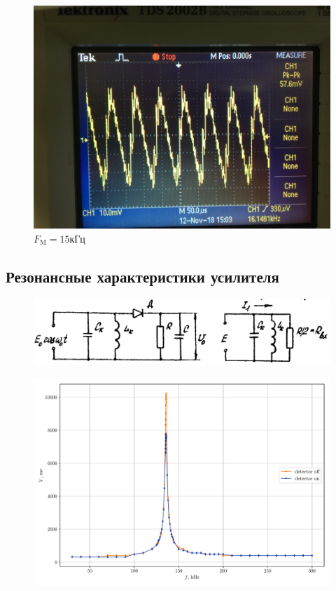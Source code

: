 \begin{figure}[h!]
\begin{minipage}{0.33\linewidth}
		\caption*{$R_2C_2$}
		\caption*{$F_\text{M}=7\text{кГц}$}
	\end{minipage}
	\begin{minipage}{0.33\linewidth}
		\centering
		\includegraphics[width=0.9\linewidth]{photo/15kHztau2.jpg}
		\caption*{$R_2C_2$}
		\caption*{$F_\text{M}=15\text{кГц}$}
	\end{minipage}
\end{figure}

\subsection{Резонансные характеристики усилителя}
 \begin{figure}[h!]
	\centering
	\includegraphics[width=\linewidth]{picture/pic12.jpg}
	\caption{}
	\label{pic:12}
\end{figure}

 \begin{figure}[H]
 	\centering
 	\includegraphics[width=\linewidth]{plots/exp3c.pdf}
 	\caption{}
 	\label{exp:3.4}
 \end{figure}
